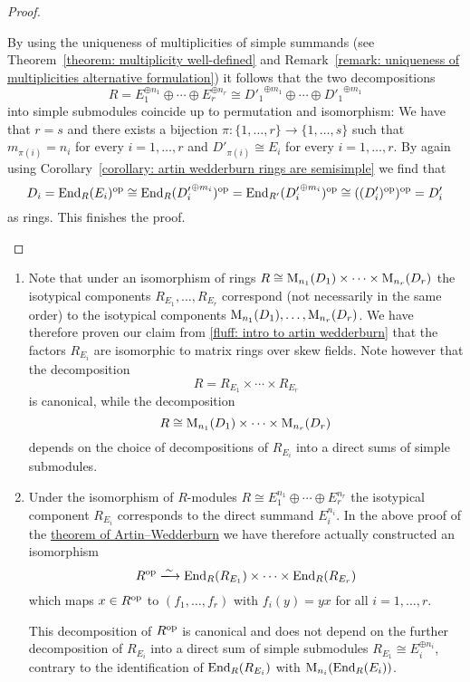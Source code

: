 \begin{proof}
\begin{enumerate}
      By using the uniqueness of multiplicities of simple summands (see Theorem~\ref{theorem: multiplicity well-defined} and Remark~\ref{remark: uniqueness of multiplicities alternative formulation}) it follows that the two decompositions
      \[
              R
        =     E_1^{\oplus n_1} \oplus \dotsb \oplus E_r^{\oplus n_r}
        \cong {D'_1}^{\oplus m_1} \oplus \dotsb \oplus {D'_1}^{\oplus m_1}
      \]
      into simple submodules coincide up to permutation and isomorphism:
      We have that $r = s$ and there exists a bijection $\pi \colon \{1, \dotsc, r\} \to \{1, \dotsc, s\}$ such that $m_{\pi(i)} = n_i$ for every $i = 1, \dotsc, r$ and $D'_{\pi(i)} \cong E_i$ for every $i = 1, \dotsc, r$.
      By again using Corollary~\ref{corollary: artin wedderburn rings are semisimple} we find that
      \[
              D_i
        =     \operatorname{End}_R(E_i)^{\mathrm{op}}
        \cong \operatorname{End}_R({D'_i}^{\oplus m_i})^{\mathrm{op}}
        =     \operatorname{End}_{R'}({D'_i}^{\oplus m_i})^{\mathrm{op}}
        \cong ((D'_i)^{\mathrm{op}})^{\mathrm{op}}
        =     D'_i
      \]
      as rings.
      This finishes the proof.
    \qedhere
  \end{enumerate}
\end{proof}


\begin{remark}
  \leavevmode
  \begin{enumerate}
    \item
      Note that under an isomorphism of rings $R \cong \operatorname{M}_{n_1}(D_1) \times \dotsb \times \operatorname{M}_{n_r}(D_r)$ the isotypical components $R_{E_1}, \dotsc, R_{E_r}$ correspond (not necessarily in the same order) to the isotypical components $\operatorname{M}_{n_1}(D_1), \dotsc, \operatorname{M}_{n_r}(D_r)$.
      We have therefore proven our claim from \ref{fluff: intro to artin wedderburn} that the factors $R_{E_i}$ are isomorphic to matrix rings over skew fields.
      Note however that the decomposition
      \[
          R
        = R_{E_1} \times \dotsb \times R_{E_r}
      \]
      is canonical, while the decomposition
      \[
              R
        \cong \operatorname{M}_{n_1}(D_1) \times \dotsb \times \operatorname{M}_{n_r}(D_r)
      \]
      depends on the choice of decompositions of $R_{E_i}$ into a direct sums of simple submodules.
    \item
      Under the isomorphism of $R$-modules $R \cong E_1^{n_1} \oplus \dotsb \oplus E_r^{n_r}$ the isotypical component $R_{E_i}$ corresponds to the direct summand $E_i^{n_i}$.
      In the above proof of the \hyperref[theorem: artin wedderburn theorem]{theorem of Artin--Wedderburn} we have therefore actually constructed an isomorphism
      \[
                                R^\op
        \xlongrightarrow{\sim}  \End_R(R_{E_1}) \times \dotsb \times \End_R(R_{E_r})
      \]
      which maps $x \in R^{\mathrm{op}}$ to $(f_1, \dotsc, f_r)$ with $f_i(y) = yx$ for all $i = 1, \dotsc, r$.
      
      This decomposition of $R^{\mathrm{op}}$ is canonical and does not depend on the further decomposition of $R_{E_i}$ into a direct sum of simple submodules $R_{E_1} \cong E_i^{\oplus n_i}$, contrary to the identification of $\operatorname{End}_R(R_{E_i})$ with $\operatorname{M}_{n_i}(\operatorname{End}_R(E_i))$.
  \end{enumerate}
\end{remark}




